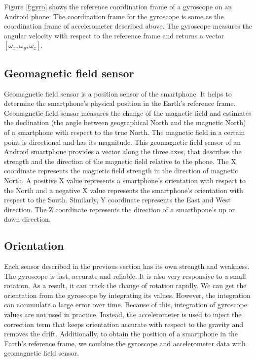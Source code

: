 Figure \ref{f:gyro} shows the reference coordination frame of a gyroscope on an Android phone.
The coordination frame for the gyroscope is same as the coordination frame of accelerometer described above.
The gyroscope measures the angular velocity with respect to the reference frame and returns a vector $[\omega_x, \omega_y, \omega_z]$.


\subsection{Geomagnetic field sensor}
Geomagnetic field sensor is a position sensor of the smartphone.
It helps to determine the smartphone's physical position in the Earth's reference frame.
Geomagnetic field sensor measures the change of the magnetic field and estimates the declination (the angle between geographical North and the magnetic North) of a smartphone with respect to the true North. 
The magnetic field in a certain point is directional and has its magnitude.
This geomagnetic field sensor of an Android smartphone provides a vector along the three axes, that describes the strength and the direction of the magnetic field relative to the phone.
The X coordinate represents the magnetic field strength in the direction of magnetic North.
A positive X value represents a smartphone's orientation with respect to the North and a negative X value represents the smartphone's orientation with respect to the South.
Similarly, Y coordinate represents the East and West direction.
The Z coordinate represents the direction of a smarthpone's up or down direction.


\subsection{Orientation}
Each sensor described in the previous section has its own strength and weakness.
The gyroscope is fast, accurate and reliable.
It is also very responsive to a small rotation.
As a result, it can track the change of rotation rapidly.
We can get the orientation from the gyroscope by integrating its values.
However, the integration can accumulate a large error over time.
Because of this, integration of gyroscope values are not used in practice. 
Instead, the accelerometer is used to inject the correction term that keeps orientation accurate with respect to the gravity and removes the drift.
Additionally, to obtain the position of a smartphone in the Earth's reference frame, we combine the gyroscope and accelerometer data with geomagnetic field sensor.

